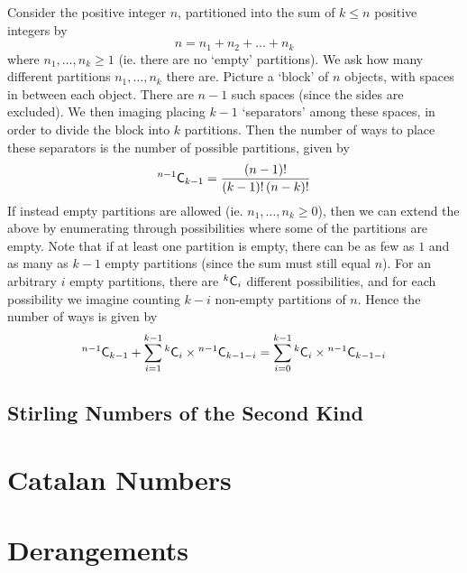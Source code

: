 \documentclass[11pt]{report} %
\begin{document}
Consider the positive integer $n$, partitioned into the sum of $k \leq n$ positive integers by
\begin{equation}
n = n_{1} + n_{2} + \dots + n_{k}
\end{equation}
where $n_{1}, \dots, n_{k} \geq 1$ (ie. there are no `empty' partitions). We ask how many different partitions $n_{1}, \dots, n_{k}$ there are. Picture a `block' of $n$ objects, with spaces in between each object. There are $n - 1$ such spaces (since the sides are excluded). We then imaging placing $k - 1$ `separators' among these spaces, in order to divide the block into $k$ partitions. Then the number of ways to place these separators is the number of possible partitions, given by
\begin{equation}
\mathstrut^{n-1}\mathsf{C}_{k - 1} = \dfrac{\left(n - 1\right)!}{\left(k - 1\right)!\left(n - k\right)!}
\end{equation}
If instead empty partitions are allowed (ie. $n_{1}, \dots, n_{k} \geq 0$), then we can extend the above by enumerating through possibilities where some of the partitions are empty. Note that if at least one partition is empty, there can be as few as $1$ and as many as $k - 1$ empty partitions (since the sum must still equal $n$). For an arbitrary $i$ empty partitions, there are $\mathstrut^{k}\mathsf{C}_{i}$ different possibilities, and for each possibility we imagine counting $k - i$ non-empty partitions of $n$. Hence the number of ways is given by
\begin{equation}
\mathstrut^{n-1}\mathsf{C}_{k - 1} + \sum_{i = 1}^{k - 1}\mathstrut^{k}\mathsf{C}_{i}\times\mathstrut^{n-1}\mathsf{C}_{k - 1 - i} = \sum_{i = 0}^{k - 1}\mathstrut^{k}\mathsf{C}_{i}\times\mathstrut^{n-1}\mathsf{C}_{k - 1 - i}
\end{equation}

\subsection{Stirling Numbers of the Second Kind}

\section{Catalan Numbers \cite{Lange2010}}

\section{Derangements}
\end{document}
